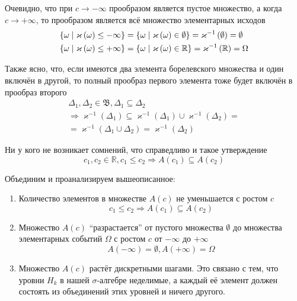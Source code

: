 Очевидно, что при $c\to-\infty$ прообразом является пустое множество,
а когда $c\to+ \infty$, то прообразом является всё множество элементарных исходов
\begin{align*}
  \left\{ \omega \;\middle|\; \varkappa\left( \omega \right) \le -\infty \right\}
      &= \left\{ \omega \;\middle|\; \varkappa\left(\omega\right)\in\emptyset \right\}
      = \varkappa^{-1}\left( \emptyset \right)
      = \emptyset \\
  \left\{ \omega \;\middle|\; \varkappa\left( \omega \right) \le + \infty \right\}
      &= \left\{ \omega \;\middle|\;\varkappa\left(\omega\right)\in\mathbb{R} \right\}
      = \varkappa^{-1}\left( \mathbb{R} \right)
      = \Omega
\end{align*}

Также ясно,
что, если имеются два элемента борелевского множества и один включён в другой,
то полный прообраз первого элемента тоже будет включён в прообраз второго
\begin{align*}
  \Delta_1, \Delta_2 \in \mathfrak{B},
  \Delta_1 \subseteq \Delta_2 \\
  \Rightarrow \varkappa^{-1}\left( \Delta_1 \right)
      \subseteq \varkappa^{-1}\left( \Delta_1 \right)
      \cup \varkappa^{-1}\left( \Delta_2 \right) = \\
      = \varkappa^{-1}\left( \Delta_1 \cup \Delta_2 \right)
      = \varkappa^{-1}\left( \Delta_2 \right)
\end{align*}

Ни у кого не возникает сомнений, что справедливо и такое утверждение
$$c_1, c_2 \in \mathbb{R}, c_1 \le c_2
  \Rightarrow A\left( c_1 \right) \subseteq A\left( c_2 \right)$$

Объединим и проанализируем вышеописанное:
\begin{enumerate}
  \item Количество элементов в множестве $A\left( c \right)$
      не уменьшается с ростом $c$
      $$c_1 \le c_2
      \Rightarrow A\left( c_1 \right) \subseteq A\left( c_2 \right)$$

  \item Множество $A\left( c \right)$ ``разрастается''
      от пустого множества $\emptyset$
      до множества элементарных событий $\Omega$
      с ростом $c$ от $-\infty$ до $+ \infty$
      $$A\left( -\infty \right)= \emptyset, A\left( + \infty \right)= \Omega$$

  \item Множество $A\left( c \right)$ растёт дискретными шагами.
      Это связано с тем, что уровни $H_k$ в нашей $\sigma$-алгебре неделимые,
      а каждый её элемент должен состоять из
      объединений этих уровней и ничего другого.
\end{enumerate}

